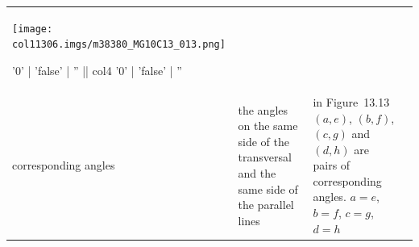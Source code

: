 \begin{table}[H]
\begin{center}
\begin{xtabular*}{\mytablewidth}[t]{|p{3cm}|p{3cm}|p{3cm}|p{20\mystarwidth}|}
\label{m38380*id316923}
    \begin{center}
   
\label{m38380*id316923!!!underscore!!!media}\label{
m38380*id316923!!!underscore!!!printimage}\texttt{[image: 
col11306.imgs/m38380\_MG10C13\_013.png]} %
        
      \vspace{2pt}
    \vspace{.1in}
    
    \end{center}



    \addtocounter{footnote}{-0}
    
'0' | 'false' | '' || col4 '0' | 'false' | ''
     \tabularnewline{}
    
    
        corresponding angles &
    
    
        the angles on the same side of the transversal and the same side of the
parallel lines &
    
    
        in Figure~13.13 \begin{math}\left(a,e\right)\end{math},
\begin{math}\left(b,f\right)\end{math}, \begin{math}\left(c,g\right)\end{math}
and \begin{math}\left(d,h\right)\end{math} are pairs of corresponding angles. 
\begin{math}a=e\end{math}, \begin{math}b=f\end{math}, \begin{math}c=g\end{math},
\begin{math}d=h\end{math} &
    

\end{xtabular*}
\end{center}
\end{table}
